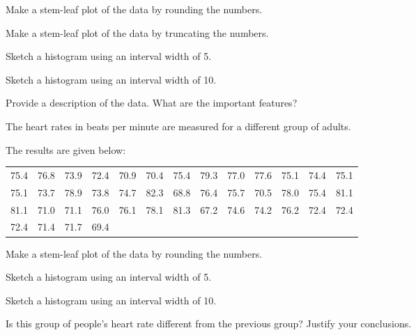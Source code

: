 \begin{problem}
    \begin{subproblem}
      \item Make a stem-leaf plot of the data by rounding the numbers.
        \vfill
      \item Make a stem-leaf plot of the data by truncating the
        numbers.
        \vfill
        \clearpage
      \item Sketch a histogram using an interval width of 5.
        \vfill
      \item Sketch a histogram using an interval width of 10.
        \vfill
      \item Provide a description of the data. What are the important features?
        \vspace{5em}
    \end{subproblem}

\clearpage

\item The heart rates in beats per minute are measured for a different
  group of adults.

    The results are given below:\\
    \begin{tabular}{rrrrrrrrrrrrr}
      75.4 & 76.8 & 73.9 & 72.4 & 70.9 & 70.4 & 75.4 & 79.3 & 77.0 & 77.6 & 75.1 & 74.4 & 75.1 \\
      75.1 & 73.7 & 78.9 & 73.8 & 74.7 & 82.3 & 68.8 & 76.4 & 75.7 & 70.5 & 78.0 & 75.4 & 81.1 \\
      81.1 & 71.0 & 71.1 & 76.0 & 76.1 & 78.1 & 81.3 & 67.2 & 74.6 & 74.2 & 76.2 & 72.4 & 72.4 \\
      72.4 & 71.4 & 71.7 & 69.4
    \end{tabular}
    
    \begin{subproblem}
      \item Make a stem-leaf plot of the data by rounding the numbers.
        \vfill
      \item Sketch a histogram using an interval width of 5.
        \vfill
        \clearpage
      \item Sketch a histogram using an interval width of 10.
        \vfill
      \item Is this group of people's heart rate different from the
        previous group? Justify your conclusions.

        \vspace{4em}
    \end{subproblem}


\end{problem}

